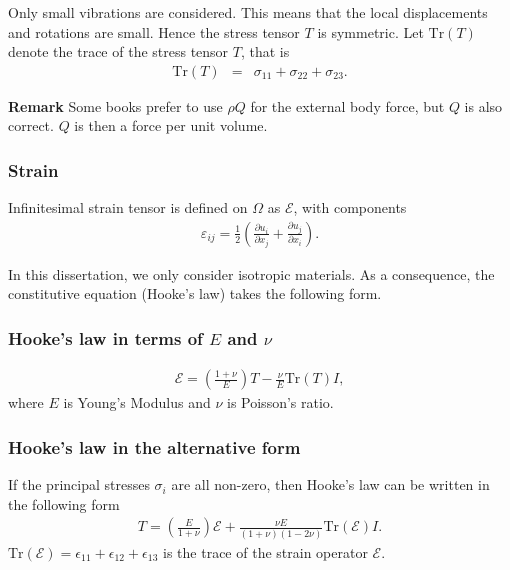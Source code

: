 \documentclass[../../main.tex]{subfiles}
\begin{document}
Only small vibrations are considered. This means that the local displacements
and rotations are small. Hence the stress tensor $T$ is symmetric. Let
$\textrm{Tr}(T)$\label{sym:TrT} denote the trace of the stress tensor $T$, that is
\begin{eqnarray}
	\textrm{Tr}(T) & = & \sigma_{11} + \sigma_{22} + \sigma_{23}. \label{eq:stress_tensor_t}
\end{eqnarray}

\textbf{Remark} Some books prefer to use $\rho Q$ for the external body force, but $Q$ is also correct. $Q$ is then a force per unit volume.

\subsubsection*{Strain}\label{sssec:3D_Model:Strain}
Infinitesimal strain tensor is defined on $\Omega$ as $\mathcal{E}$\label{sym:mathcalE}, with components
\begin{eqnarray}
	\varepsilon_{ij} = \frac{1}{2}\left( \frac{\partial u_i}{\partial x_j} + \frac{\partial u_j}{\partial x_i} \right). \label{eq:3D_Model:Strain}
\end{eqnarray}\label{sym:varepsilonij}

In this dissertation, we only consider isotropic materials. As a consequence,
the constitutive equation (Hooke's law) takes the following form.

\subsubsection*{Hooke's law in terms of $E$ and $\nu$}\label{sssec:3D_Model:Hooke'sLaw1}\label{sym:E} \label{sym:nu}
\begin{eqnarray}
	\mathcal{E} = \left( \frac{1+\nu}{E} \right)T - \frac{\nu}{E}\textrm{Tr}(T)I,  \label{eq:3D_Model:HL}
\end{eqnarray} where $E$ is Young's Modulus and $\nu$ is Poisson's ratio.

\subsubsection*{Hooke's law in the alternative form}\label{sssec:3D_Model:Hooke'sLaw2}
If the principal stresses $\sigma_i$ are all non-zero, then Hooke's law can be written in the following form
\begin{eqnarray}
	T = \left( \frac{E}{1+\nu} \right)\mathcal{E} + \frac{\nu E}{(1+\nu)(1-2\nu)}\textrm{Tr}(\mathcal{E})I \label{eq:3D_Model:CE}.
\end{eqnarray}
$\textrm{Tr}(\mathcal{E}) = \epsilon_{11} + \epsilon_{12} + \epsilon_{13}$ is the trace of the strain operator $\mathcal{E}$.\\
\end{document}
